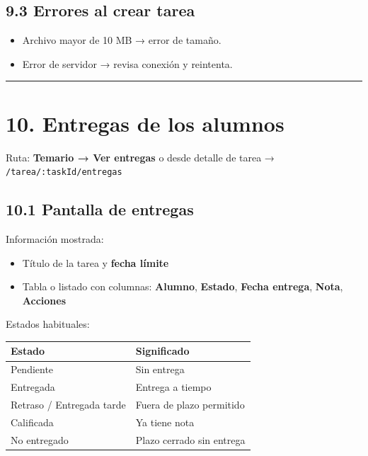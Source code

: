\documentclass[
  spanish,
  11pt,
]{report}
\newcounter{none} %
\providecommand{\tightlist}{%
  \setlength{\itemsep}{0pt}\setlength{\parskip}{0pt}}
\begin{document}
\subsection{9.3 Errores al crear tarea}\label{errores-al-crear-tarea}

\begin{itemize}
\tightlist
\item
  Archivo mayor de 10 MB → error de tamaño.
\item
  Error de servidor → revisa conexión y reintenta.
\end{itemize}

\begin{center}\rule{0.5\linewidth}{0.5pt}\end{center}

\section{10. Entregas de los alumnos}\label{entregas-de-los-alumnos}

Ruta: \textbf{Temario → Ver entregas} o desde detalle de tarea →
\texttt{/tarea/:taskId/entregas}

\subsection{10.1 Pantalla de entregas}\label{pantalla-de-entregas}

Información mostrada:

\begin{itemize}
\tightlist
\item
  Título de la tarea y \textbf{fecha límite}
\item
  Tabla o listado con columnas: \textbf{Alumno}, \textbf{Estado},
  \textbf{Fecha entrega}, \textbf{Nota}, \textbf{Acciones}
\end{itemize}

Estados habituales:

{\def\LTcaptype{none} %
\begin{longtable}[]{@{}ll@{}}
\toprule\noalign{}
Estado & Significado \\
\midrule\noalign{}
\endhead
\bottomrule\noalign{}
\endlastfoot
Pendiente & Sin entrega \\
Entregada & Entrega a tiempo \\
Retraso / Entregada tarde & Fuera de plazo permitido \\
Calificada & Ya tiene nota \\
No entregado & Plazo cerrado sin entrega \\
\end{longtable}
}
\end{document}
